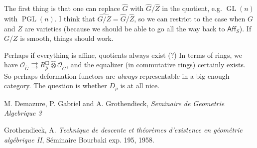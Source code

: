 \documentclass{article}
\newcommand{\cO}{\mathcal{O}}
\numberwithin{theorem}{section}
\begin{document}
The first thing is that one can replace $\hat G$ with $\hat G/\hat Z$ in the 
quotient, e.g. $\operatorname{GL}(n)$ with $\operatorname{PGL}(n)$. I think 
that $\widehat{G/Z}=\hat G/\hat Z$, so we can restrict to the case when 
$G$ and $Z$ are varieties (because we should be able to go all the way 
back to $\mathsf{Aff}_S$). If $G/Z$ is smooth, things should work. 

Perhaps if everything is affine, quotients always exist (?) In terms of 
rings, we have 
$\cO_{\hat G}\rightrightarrows R_{\bar\rho}^\Box\hat\otimes \cO_{\hat G}$, and 
the equalizer (in commutative rings) certainly exists. So perhaps deformation 
functors are \emph{always} representable in a big enough category. The 
question is whether $D_{\bar\rho}$ is at all nice. 





\begin{thebibliography}{9}
   M. Demazure, P. Gabriel and A. Grothendieck, \emph{Seminaire de Geometrie Algebrique 3}

   Grothendieck, A. \emph{Technique de descente et th\'eor\`emes 
    d'existence en g\'eom\'etrie alg\'ebrique II}, S\'eminaire Bourbaki 
    exp. 195, 1958. 
\end{thebibliography}
\end{document}
